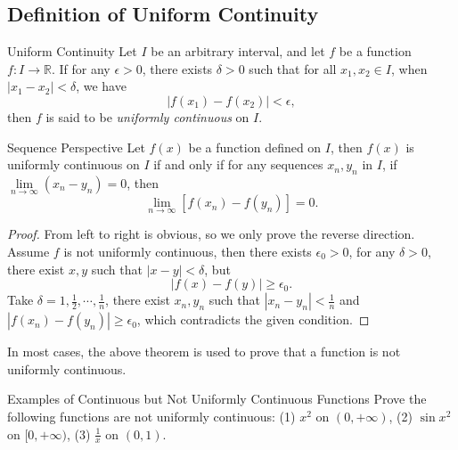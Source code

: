 \subsection{Definition of Uniform Continuity}

\begin{definition}{Uniform Continuity}{}
  Let $I$ be an arbitrary interval,
  and let $f$ be a function $f: I \rightarrow \mathbb{R}$.
  If for any $\epsilon > 0$, there exists $\delta > 0$ such that for all $x_1,
  x_2 \in I$, when $|x_1 - x_2| < \delta$, we have
  \begin{equation}
    |f(x_1) - f(x_2)| < \epsilon,
  \end{equation}
  then $f$ is said to be \emph{uniformly continuous} on $I$.
\end{definition}

\begin{proposition}{Sequence Perspective}{}
  Let $f(x)$ be a function defined on $I$,
  then $f(x)$ is uniformly continuous on $I$ if and only if
  for any sequences $x_n, y_n$ in $I$,
  if $\lim \limits _{n \rightarrow \infty} (x_n - y_n) = 0$,
  then
  \begin{equation}
    \lim \limits _{n \rightarrow \infty} \left[ f(x_n) - f(y_n) \right] = 0.
  \end{equation}
\end{proposition}

\begin{proof}
  From left to right is obvious, so we only prove the reverse direction.
  Assume $f$ is not uniformly continuous,
  then there exists $\epsilon_0 > 0$, for any $\delta > 0$,
  there exist $x, y$ such that $|x - y| < \delta$, but
  \begin{equation}
    |f(x) - f(y)| \geq \epsilon_0.
  \end{equation}
  Take $\delta = 1, \frac{1}{2}, \cdots, \frac{1}{n}$, there exist $x_n, y_n$
  such that $|x_n - y_n| < \frac{1}{n}$ and $|f(x_n) - f(y_n)| \geq \epsilon_0$,
  which contradicts the given condition.
\end{proof}

\begin{note}
  In most cases, the above theorem is used to prove that
  a function is not uniformly continuous.
\end{note}

\begin{example}{Examples of Continuous but Not Uniformly Continuous Functions}{}
  Prove the following functions are not uniformly continuous:
  (1) $x^2$ on $(0, +\infty)$,
  (2) $\sin x^2$ on $[0, + \infty)$,
  (3) $\frac{1}{x}$ on $(0, 1)$.
\end{example}


